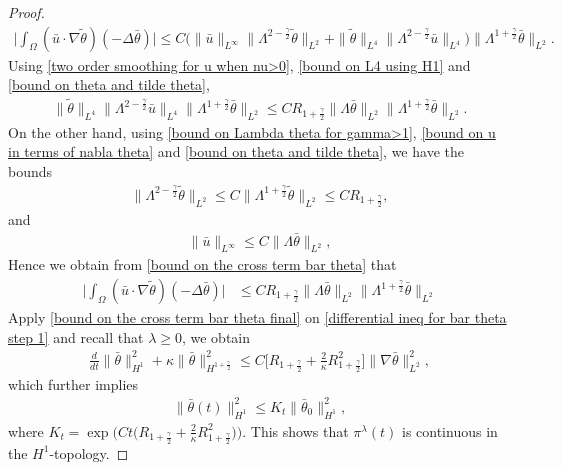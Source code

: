 \documentclass[reqno]{amsart}%
\theoremstyle{definition}
\theoremstyle{remark}
\numberwithin{equation}{section}
\newcommand{\1}{\mathbf{1}}
\newcommand{\pin}{\pi^{\lambda}}
\newcommand{\intox}{\int_{\Omega}}
\numberwithin{equation}{section}
\numberwithin{theorem}{section}
\numberwithin{figure}{section}
\begin{document}
\begin{proof}
\begin{align}\label{bound on the cross term bar theta}
\Big|\intox(\bar{u}\cdot\nabla\tilde\theta)(-\Delta\bar{\theta})\Big|\le C\Big(\|\bar{u}\|_{L^\infty}\|\Lambda^{2-\frac{\gamma}{2}}\tilde\theta\|_{L^2}+\|\tilde\theta\|_{L^4}\|\Lambda^{2-\frac{\gamma}{2}}\bar{u}\|_{L^4}\Big)\|\Lambda^{1+\frac{\gamma}{2}}\bar{\theta}\|_{L^2}.
\end{align}
Using \eqref{two order smoothing for u when nu>0}, \eqref{bound on L4 using H1} and \eqref{bound on theta and tilde theta},
\begin{align*}
\|\tilde\theta\|_{L^4}\|\Lambda^{2-\frac{\gamma}{2}}\bar{u}\|_{L^4}\|\Lambda^{1+\frac{\gamma}{2}}\bar{\theta}\|_{L^2}\le CR_{1+\frac{\gamma}{2}}\|\Lambda\bar\theta\|_{L^2}\|\Lambda^{1+\frac{\gamma}{2}}\bar{\theta}\|_{L^2}.
\end{align*}
On the other hand, using \eqref{bound on Lambda theta for gamma>1}, \eqref{bound on u in terms of nabla theta} and \eqref{bound on theta and tilde theta}, we have the bounds
\begin{align*}
\|\Lambda^{2-\frac{\gamma}{2}}\tilde\theta\|_{L^2}\le C\|\Lambda^{1+\frac{\gamma}{2}}\tilde\theta\|_{L^2}\le CR_{1+\frac{\gamma}{2}},
\end{align*}
and
\begin{align*}
\|\bar u\|_{L^\infty}\le C\|\Lambda\bar\theta\|_{L^2},
\end{align*}
Hence we obtain from \eqref{bound on the cross term bar theta} that
\begin{align}\label{bound on the cross term bar theta final}
\Big|\intox(\bar{u}\cdot\nabla\tilde\theta)(-\Delta\bar{\theta})\Big|&\le CR_{1+\frac{\gamma}{2}}\|\Lambda\bar\theta\|_{L^2}\|\Lambda^{1+\frac{\gamma}{2}}\bar{\theta}\|_{L^2}
\end{align}
Apply \eqref{bound on the cross term bar theta final} on \eqref{differential ineq for bar theta step 1} and recall that $\lambda\ge0$, we obtain
\begin{align*}
\frac{d}{dt}\|\bar\theta\|^2_{H^1}+\kappa\|\bar\theta\|^2_{H^{1+\frac{\gamma}{2}}}\le C\Big[R_{1+\frac{\gamma}{2}}+\frac{2}{\kappa}R_{1+\frac{\gamma}{2}}^2\Big]\|\nabla\bar{\theta}\|^2_{L^2},
\end{align*}
which further implies
\begin{align*}
\|\bar\theta(t)\|^2_{H^1}\le K_t\|\bar\theta_0\|^2_{H^1},
\end{align*}
where $K_t=\exp\Big(Ct\Big(R_{1+\frac{\gamma}{2}}+\frac{2}{\kappa}R_{1+\frac{\gamma}{2}}^2\Big)\Big)$. This shows that $\pin(t)$ is continuous in the $H^1$-topology.


\end{proof}
\end{document}
